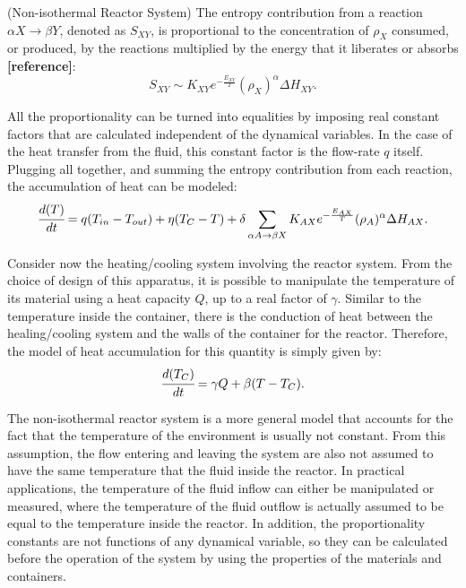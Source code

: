 \documentclass[a4paper,11pt]{book}
\numberwithin{figure}{chapter}
\numberwithin{equation}{chapter}
\numberwithin{table}{chapter}
\theoremstyle{definition}
\newtheorem{example}{Example}[chapter]
\newcounter{boxed-theorem}
\newcounter{boxed-definition}
\newcounter{boxed-example}
\newenvironment{boxed-example}[1]
{\colorlet{shadecolor}{pastelRed!20} \begin{shaded} \begin{example}{#1}}
{\end{example} \end{shaded}}
\begin{document}
\begin{boxed-example}{(Non-isothermal Reactor System)}
    The entropy contribution from a reaction $\alpha X \rightarrow \beta Y$, denoted as $S_{XY}$, is proportional to the concentration of $\rho_X$ consumed, or produced, by the reactions multiplied by the energy that it liberates or absorbs \textbf{[reference]}:
    \begin{equation}
        S_{XY} \sim K_{XY} e^{-\frac{E_{XY}}{T}} (\rho_X)^{\alpha} \Delta H_{XY}
    .\end{equation}

    All the proportionality can be turned into equalities by imposing real constant factors that are calculated independent of the dynamical variables. In the case of the heat transfer from the fluid, this constant factor is the flow-rate $q$ itself. Plugging all together, and summing the entropy contribution from each reaction, the accumulation of heat can be modeled:
    \begin{equation}
        \cfrac{d(T)}{dt} = q(T_{in} - T_{out}) + \eta (T_C - T) + \delta \sum_{\alpha A \rightarrow \beta X} K_{AX} e^{-\frac{E_{AX}}{T}} (\rho_A)^{\alpha} \Delta H_{AX}
    .\end{equation}
    
    Consider now the heating/cooling system involving the reactor system. From the choice of design of this apparatus, it is possible to manipulate the temperature of its material using a heat capacity $Q$, up to a real factor of $\gamma$. Similar to the temperature inside the container, there is the conduction of heat between the healing/cooling system and the walls of the container for the reactor. Therefore, the model of heat accumulation for this quantity is simply given by:
    \begin{equation}
        \cfrac{d(T_C)}{dt} = \gamma Q + \beta (T - T_C)
    .\end{equation}
\end{boxed-example}

The non-isothermal reactor system is a more general model that accounts for the fact that the temperature of the environment is usually not constant. From this assumption, the flow entering and leaving the system are also not assumed to have the same temperature that the fluid inside the reactor. In practical applications, the temperature of the fluid inflow can either be manipulated or measured, where the temperature of the fluid outflow is actually assumed to be equal to the temperature inside the reactor. In addition, the proportionality constants are not functions of any dynamical variable, so they can be calculated before the operation of the system by using the properties of the materials and containers.
\end{document}
